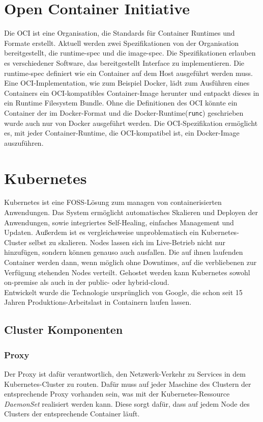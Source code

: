 \section{Open Container Initiative}
Die \ac{OCI} ist eine Organisation, die Standards für Container Runtimes und Formate erstellt.
Aktuell werden zwei Spezifikationen von der Organisation bereitgestellt, die \ac{runtime-spec} und die \ac{image-spec}.
Die Spezifikationen erlauben es verschiedener Software, das bereitgestellt Interface zu implementieren.
Die \ac{runtime-spec} definiert wie ein Container auf dem Host ausgeführt werden muss. 
Eine \ac{OCI}-Implementation, wie zum Beispiel Docker, lädt zum Ausführen eines Containers ein \ac{OCI}-kompatibles Container-Image herunter und entpackt dieses in ein Runtime Filesystem Bundle.
Ohne die Definitionen des \ac{OCI} könnte ein Container der im Docker-Format und die Docker-Runtime(\texttt{runc}) geschrieben wurde auch nur von Docker ausgeführt werden.
Die \ac{OCI}-Spezifikation ermöglicht es, mit jeder Container-Runtime, die \ac{OCI}-kompatibel ist, ein Docker-Image auszuführen. \cite{oci}



\section{Kubernetes}
Kubernetes ist eine \ac{FOSS}-Lösung zum managen von containerisierten Anwendungen.
Das System ermöglicht automatisches Skalieren und Deployen der Anwendungen, sowie integriertes Self-Healing, einfaches Management und Updaten.
Außerdem ist es vergleichsweise unproblematisch ein Kubernetes-Cluster selbst zu skalieren. 
Nodes lassen sich im Live-Betrieb nicht nur hinzufügen, sondern können genauso auch ausfallen. 
Die auf ihnen laufenden Container werden dann, wenn möglich ohne Downtimes, auf die verbliebenen zur Verfügung stehenden Nodes verteilt. 
Gehostet werden kann Kubernetes sowohl on-premise als auch in der public- oder hybrid-cloud.
\\
Entwickelt wurde die Technologie ursprünglich von Google, die schon seit 15 Jahren Produktions-Arbeitslast in Containern laufen lassen.
\cite{kubernetes}

\subsection{Cluster Komponenten}
\subsubsection{Proxy}
Der Proxy ist dafür verantwortlich, den Netzwerk-Verkehr zu Services in dem Kubernetes-Cluster zu routen. 
Dafür muss auf jeder Maschine des Clustern der entsprechende Proxy vorhanden sein, was mit der Kubernetes-Ressource \textit{DaemonSet} realisiert werden kann.
Diese sorgt dafür, dass auf jedem Node des Clusters der entsprechende Container läuft.\cite[S.34]{Kubernetes_up_and_running}
